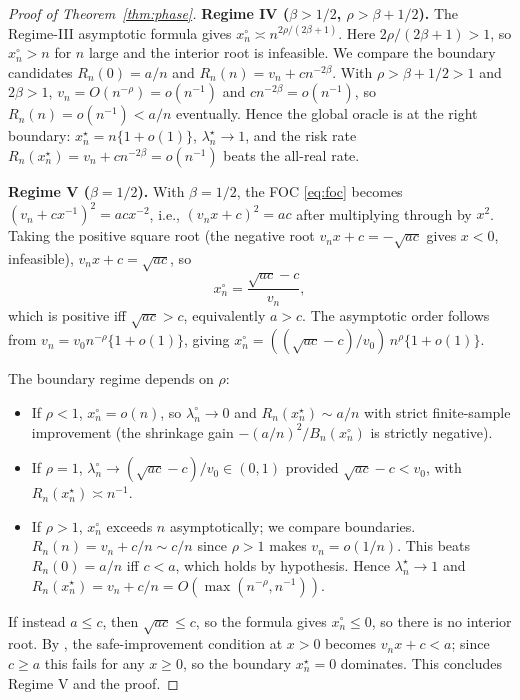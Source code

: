\begin{proof}[Proof of Theorem~\ref{thm:phase}]
\medskip
\noindent\textbf{Regime IV ($\beta > 1/2$, $\rho > \beta + 1/2$).} The Regime-III asymptotic formula gives $x_n^\circ \asymp n^{2\rho/(2\beta+1)}$. Here $2\rho/(2\beta+1) > 1$, so $x_n^\circ > n$ for $n$ large and the interior root is infeasible. We compare the boundary candidates $R_n(0) = a/n$ and $R_n(n) = v_n + c n^{-2\beta}$. With $\rho > \beta + 1/2 > 1$ and $2\beta > 1$, $v_n = O(n^{-\rho}) = o(n^{-1})$ and $c n^{-2\beta} = o(n^{-1})$, so $R_n(n) = o(n^{-1}) < a/n$ eventually. Hence the global oracle is at the right boundary: $x_n^\star = n\{1+o(1)\}$, $\lambda_n^\star \to 1$, and the risk rate $R_n(x_n^\star) = v_n + c n^{-2\beta} = o(n^{-1})$ beats the all-real rate.

\medskip
\noindent\textbf{Regime V ($\beta = 1/2$).} With $\beta = 1/2$, the FOC \cref{eq:foc} becomes $(v_n + c x^{-1})^2 = a c x^{-2}$, i.e., $(v_n x + c)^2 = a c$ after multiplying through by $x^2$. Taking the positive square root (the negative root $v_n x + c = -\sqrt{a c}$ gives $x < 0$, infeasible), $v_n x + c = \sqrt{a c}$, so
\[
x_n^\circ = \frac{\sqrt{a c} - c}{v_n},
\]
which is positive iff $\sqrt{a c} > c$, equivalently $a > c$. The asymptotic order follows from $v_n = v_0 n^{-\rho}\{1+o(1)\}$, giving $x_n^\circ = ((\sqrt{ac} - c)/v_0)\, n^\rho\{1+o(1)\}$.

The boundary regime depends on $\rho$:
\begin{itemize}[leftmargin=*]
\item If $\rho < 1$, $x_n^\circ = o(n)$, so $\lambda_n^\circ \to 0$ and $R_n(x_n^\star) \sim a/n$ with strict finite-sample improvement (the shrinkage gain $-(a/n)^2/B_n(x_n^\circ)$ is strictly negative).
\item If $\rho = 1$, $\lambda_n^\circ \to (\sqrt{a c} - c)/v_0 \in (0,1)$ provided $\sqrt{a c} - c < v_0$, with $R_n(x_n^\star) \asymp n^{-1}$.
\item If $\rho > 1$, $x_n^\circ$ exceeds $n$ asymptotically; we compare boundaries. $R_n(n) = v_n + c/n \sim c/n$ since $\rho > 1$ makes $v_n = o(1/n)$. This beats $R_n(0) = a/n$ iff $c < a$, which holds by hypothesis. Hence $\lambda_n^\star \to 1$ and $R_n(x_n^\star) = v_n + c/n = O(\max(n^{-\rho}, n^{-1}))$.
\end{itemize}

If instead $a \le c$, then $\sqrt{ac} \le c$, so the formula gives $x_n^\circ \le 0$, so there is no interior root. By , the safe-improvement condition at $x > 0$ becomes $v_n x + c < a$; since $c \ge a$ this fails for any $x \ge 0$, so the boundary $x_n^\star = 0$ dominates. This concludes Regime V and the proof.
\end{proof}

